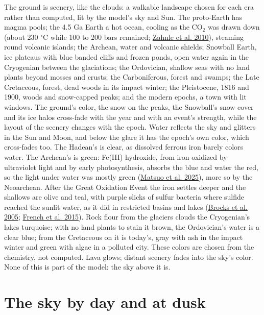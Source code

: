 \documentclass[9pt,twocolumn]{extarticle}
\begin{document}
The ground is scenery, like the clouds: a walkable landscape chosen for each era rather than computed, lit by the model's sky and Sun. The proto-Earth has magma pools; the 4.5 Ga Earth a hot ocean, cooling as the CO$_2$ was drawn down (about 230 $^\circ$C while 100 to 200 bars remained; \protect\hyperlink{cite.zahnle2010}{Zahnle et al. 2010}), steaming round volcanic islands; the Archean, water and volcanic shields; Snowball Earth, ice plateaus with blue banded cliffs and frozen ponds, open water again in the Cryogenian between the glaciations; the Ordovician, shallow seas with no land plants beyond mosses and crusts; the Carboniferous, forest and swamps; the Late Cretaceous, forest, dead woods in its impact winter; the Pleistocene, 1816 and 1900, woods and snow-capped peaks; and the modern epochs, a town with lit windows. The ground's color, the snow on the peaks, the Snowball's snow cover and its ice halos cross-fade with the year and with an event's strength, while the layout of the scenery changes with the epoch. Water reflects the sky and glitters in the Sun and Moon, and below the glare it has the epoch's own color, which cross-fades too. The Hadean's is clear, as dissolved ferrous iron barely colors water. The Archean's is green: Fe(III) hydroxide, from iron oxidized by ultraviolet light and by early photosynthesis, absorbs the blue and water the red, so the light under water was mostly green (\protect\hyperlink{cite.matsuo2025}{Matsuo et al. 2025}), more so by the Neoarchean. After the Great Oxidation Event the iron settles deeper and the shallows are olive and teal, with purple slicks of sulfur bacteria where sulfide reached the sunlit water, as it did in restricted basins and lakes (\protect\hyperlink{cite.brocks2005}{Brocks et al. 2005}; \protect\hyperlink{cite.french2015}{French et al. 2015}). Rock flour from the glaciers clouds the Cryogenian's lakes turquoise; with no land plants to stain it brown, the Ordovician's water is a clear blue; from the Cretaceous on it is today's, gray with ash in the impact winter and green with algae in a polluted city. These colors are chosen from the chemistry, not computed. Lava glows; distant scenery fades into the sky's color. None of this is part of the model: the sky above it is.


\section{The sky by day and at dusk}\label{sky}
\end{document}

